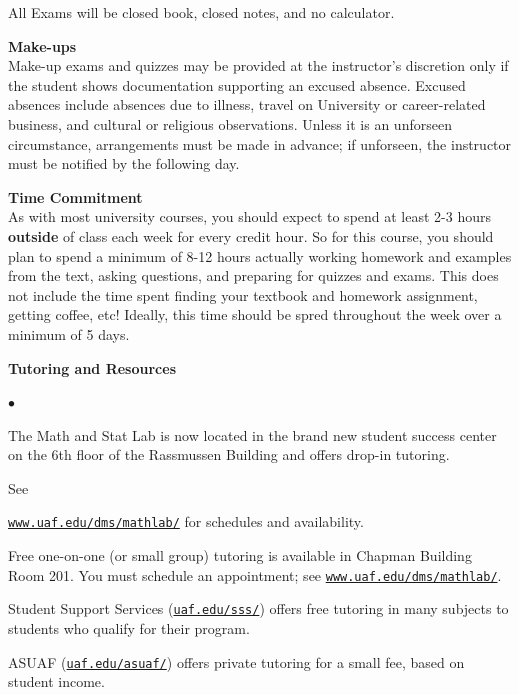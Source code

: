 \documentclass[12pt]{article}
\renewcommand{\emph}[1]{\textsf{\textbf{#1}}}
\newcommand{\localhead}[1]{\par\smallskip\textbf{#1} \smallskip\nobreak\\}%
\def\heading#1{\localhead{\large\emph{#1}}}
\newenvironment{clist}%
{\bgroup\parskip 0pt\begin{list}{$\bullet$}{\partopsep 4pt\topsep 0pt\itemsep -2pt}}%
{\end{list}\egroup}%
\begin{document}
All Exams will be closed book, closed notes, and no calculator.

\newpage

\heading{Make-ups}
Make-up exams and quizzes may be provided at the instructor's
discretion only if
the student shows documentation supporting an excused absence. Excused
absences include absences due to illness, travel on University or
career-related business, and cultural or religious
observations. Unless it is an unforseen circumstance, arrangements
must be made in advance; if unforseen, the instructor must be notified
by the following day.

\heading{Time Commitment}
As with most university courses, you should expect to spend at least
2-3 hours
{\bf outside} of class each week for every credit hour. So for this
course, you should plan to spend a minimum of 8-12 hours actually
working homework and examples from the text, asking questions, and
preparing for quizzes and exams. This does not include the time spent
finding your textbook and homework assignment, getting coffee, etc!
Ideally, this time should be spred throughout the week over a minimum
of 5 days.


\heading{Tutoring and Resources}
\vskip -30pt\strut
\begin{clist}
    \item The Math and Stat Lab is now located in the brand new
      student success center on the 6th floor of the Rassmussen Building and
      offers drop-in tutoring.

	See 

	\href{http://www.uaf.edu/dms/mathlab/}{\texttt{www.uaf.edu/dms/mathlab/}} for schedules and availability.
	\item Free
one-on-one (or small group) tutoring is available in 
Chapman Building Room 201. You must schedule an
appointment; see \href{http://www.uaf.edu/dms/mathlab/}{\texttt{www.uaf.edu/dms/mathlab/}}.
	\item Student Support Services (\href{https://uaf.edu/sss/}{\texttt{uaf.edu/sss/}}) offers free tutoring in many subjects to students who qualify for their program.
	\item ASUAF (\href{https://uaf.edu/asuaf/}{\texttt{uaf.edu/asuaf/}}) offers private tutoring for a small fee, based on student income.
\end{clist}



\strut

\vspace{-12pt}
\end{document}
